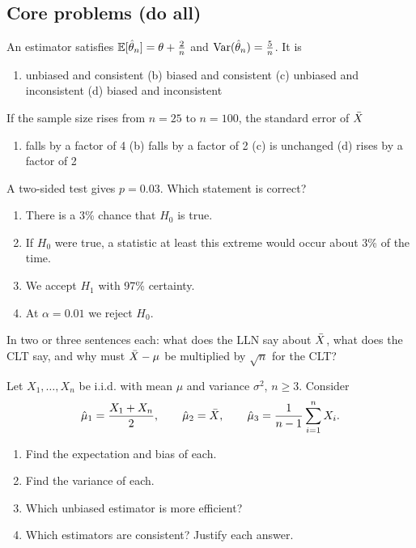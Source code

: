 \documentclass[11pt]{article}
\begin{document}
\subsection{Core problems (do all)}
\setcounter{prob}{0}

An estimator satisfies $\mathbb{E}[\hat\theta_n]=\theta+\tfrac{2}{n}$ and $\operatorname{Var}(\hat\theta_n)=\tfrac{5}{n}$. It is
\begin{enumerate}[label=(\alph*)]
  \item unbiased and consistent \quad (b) biased and consistent \quad (c) unbiased and inconsistent \quad (d) biased and inconsistent
\end{enumerate}

If the sample size rises from $n=25$ to $n=100$, the standard error of $\bar{X}$
\begin{enumerate}[label=(\alph*)]
  \item falls by a factor of 4 \quad (b) falls by a factor of 2 \quad (c) is unchanged \quad (d) rises by a factor of 2
\end{enumerate}

A two-sided test gives $p=0.03$. Which statement is correct?
\begin{enumerate}[label=(\alph*)]
  \item There is a 3\% chance that $H_0$ is true.
  \item If $H_0$ were true, a statistic at least this extreme would occur about 3\% of the time.
  \item We accept $H_1$ with 97\% certainty.
  \item At $\alpha=0.01$ we reject $H_0$.
\end{enumerate}

In two or three sentences each: what does the LLN say about $\bar{X}$, what does the CLT say, and why must $\bar{X}-\mu$ be multiplied by $\sqrt n$ for the CLT?

Let $X_1,\dots,X_n$ be i.i.d. with mean $\mu$ and variance $\sigma^2$, $n\ge 3$. Consider
\[ \hat\mu_1=\frac{X_1+X_n}{2}, \qquad \hat\mu_2=\bar{X}, \qquad \hat\mu_3=\frac{1}{n-1}\sum_{i=1}^n X_i. \]
\begin{enumerate}[label=(\alph*)]
  \item Find the expectation and bias of each.
  \item Find the variance of each.
  \item Which unbiased estimator is more efficient?
  \item Which estimators are consistent? Justify each answer.
\end{enumerate}
\end{document}

